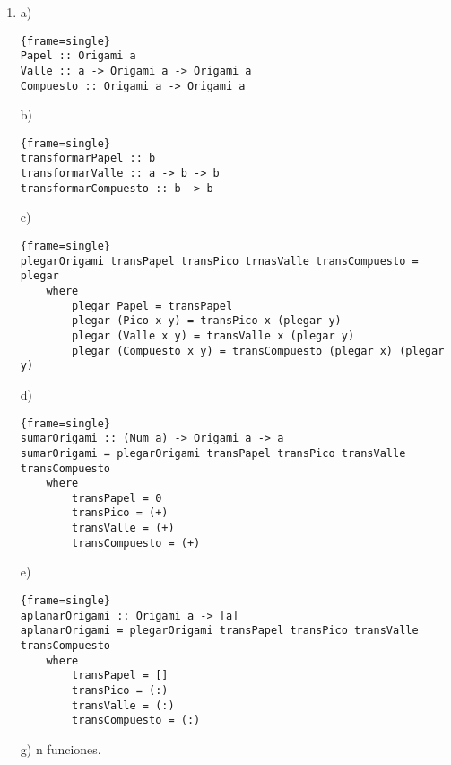 \documentclass[12pt,a4paper,spanish]{article}
\begin{document}
\begin{enumerate}
\item 
\newline
a) 
\newline
\lstset{language=Haskell, breaklines=True, basicstyle=\footnotesize}
\begin{lstlisting}{frame=single}
Papel :: Origami a
Valle :: a -> Origami a -> Origami a
Compuesto :: Origami a -> Origami a
\end{lstlisting}
\newline
\newline
b) 
\lstset{language=haskell, breaklines=True, basicstyle=\footnotesize}
\begin{lstlisting}{frame=single}
transformarPapel :: b
transformarValle :: a -> b -> b
transformarCompuesto :: b -> b
\end{lstlisting}
\newline
\newline
c) 
\lstset{language=haskell, breaklines=True, basicstyle=\footnotesize}
\begin{lstlisting}{frame=single}
plegarOrigami transPapel transPico trnasValle transCompuesto = plegar
    where
        plegar Papel = transPapel
        plegar (Pico x y) = transPico x (plegar y)
        plegar (Valle x y) = transValle x (plegar y)
        plegar (Compuesto x y) = transCompuesto (plegar x) (plegar y)
\end{lstlisting}
d)
\lstset{language=haskell, breaklines=True, basicstyle=\footnotesize}
\begin{lstlisting}{frame=single}
sumarOrigami :: (Num a) -> Origami a -> a
sumarOrigami = plegarOrigami transPapel transPico transValle transCompuesto
    where
        transPapel = 0
        transPico = (+)
        transValle = (+)
        transCompuesto = (+)
\end{lstlisting}
\newline
\newline
e) 
\lstset{language=haskell, breaklines=True, basicstyle=\footnotesize}
\begin{lstlisting}{frame=single}
aplanarOrigami :: Origami a -> [a]
aplanarOrigami = plegarOrigami transPapel transPico transValle transCompuesto
    where
        transPapel = []
        transPico = (:)
        transValle = (:)
        transCompuesto = (:)
\end{lstlisting}
\newline
\newline
g) n funciones.
\newline
\newline

\end{enumerate}
\end{document}
